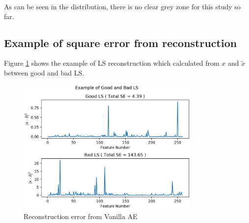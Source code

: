 As can be seen in the distribution, there is no clear grey zone for this study so far.

\subsection{Example of square error from reconstruction}
Figure \ref{fig:2016_example_se} shows the example of LS reconstruction which calculated from $x$ and $\tilde{x}$ between good and bad LS.
\begin{figure}[h!]
    \centering
    \includegraphics[width=0.8\textwidth]{images/reco/2016/example_se.png}
    \caption{Reconstruction error from Vanilla AE}
    \label{fig:2016_example_se}
\end{figure}

